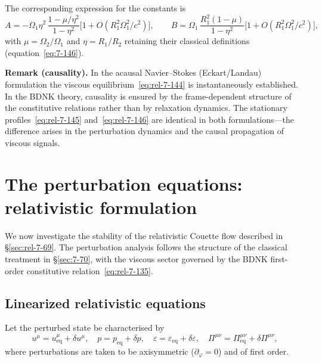 The corresponding expression for the constants is
\begin{equation}
\label{eq:rel-7-147}
A = -\Omega_{1}\eta^{2}\,\frac{1-\mu/\eta^{2}}{1-\eta^{2}}
  \bigl[1+O(R_{1}^{2}\Omega_{1}^{2}/c^{2})\bigr],
\qquad
B = \Omega_{1}\,\frac{R_{1}^{2}(1-\mu)}{1-\eta^{2}}
  \bigl[1+O(R_{1}^{2}\Omega_{1}^{2}/c^{2})\bigr],
\end{equation}
with $\mu=\Omega_{2}/\Omega_{1}$ and $\eta=R_{1}/R_{2}$ retaining
their classical definitions (equation~\eqref{eq:7-146}).

\medskip
\noindent\textbf{Remark (causality).}  In the acausal Navier--Stokes
(Eckart/Landau) formulation the viscous equilibrium~\eqref{eq:rel-7-144}
is instantaneously established.  In the BDNK theory, causality is
ensured by the frame-dependent structure of the constitutive relations
rather than by relaxation dynamics.  The stationary
profiles~\eqref{eq:rel-7-145} and~\eqref{eq:rel-7-146} are identical
in both formulations---the difference arises in the perturbation
dynamics and the causal propagation of viscous signals.

\section{The perturbation equations: relativistic
  formulation}\label{sec:rel-7-70}

We now investigate the stability of the relativistic Couette flow
described in \S\ref{sec:rel-7-69}.  The perturbation analysis follows
the structure of the classical treatment in \S\ref{sec:7-70}, with the
viscous sector governed by the BDNK first-order constitutive
relation~\eqref{eq:rel-7-135}.

\subsection{Linearized relativistic equations}\label{sec:rel-7-70a}

Let the perturbed state be characterised by
\begin{equation}
\label{eq:rel-7-148}
u^{\mu} = u^{\mu}_{\mathrm{eq}} + \delta u^{\mu},
\quad
p = p_{\mathrm{eq}} + \delta p,
\quad
\varepsilon = \varepsilon_{\mathrm{eq}} + \delta\varepsilon,
\quad
\Pi^{\mu\nu} = \Pi^{\mu\nu}_{\mathrm{eq}} + \delta\Pi^{\mu\nu},
\end{equation}
where perturbations are taken to be axisymmetric
($\partial_{\varphi}=0$) and of first order.

